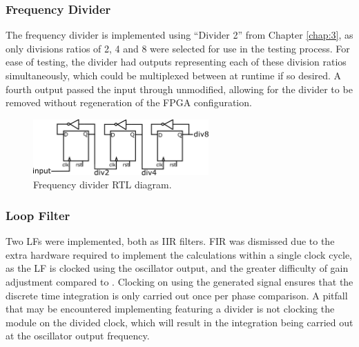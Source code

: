 \subsubsection{Frequency Divider}
The frequency divider is implemented using ``Divider 2'' from Chapter \ref{chap:3}, as only divisions ratios of 2, 4 and 8 were selected for use in the testing process. For ease of testing, the divider had outputs representing each of these division ratios simultaneously, which could be multiplexed between at runtime if so desired. A fourth output passed the input through unmodified, allowing for the divider to be removed without regeneration of the \ac{FPGA} configuration.
\begin{figure}[h]%
    \centering
    \includegraphics[width=0.6\textwidth]{../divider2}
    \caption[Frequency divider \ac{RTL} diagram]{Frequency divider \ac{RTL} diagram.}
    \label{fig:divs_impl}
\end{figure}

\subsubsection{Loop Filter}
Two \aclp{LF} were implemented, both as \ac{IIR} filters. \ac{FIR} was dismissed due to the extra hardware required to implement the calculations within a single clock cycle, as the \ac{LF} is clocked using the oscillator output, and the greater difficulty of gain adjustment compared to . Clocking on using the generated signal ensures that the discrete time integration is only carried out once per phase comparison. A pitfall that may be encountered implementing  featuring a divider is not clocking the module on the divided clock, which will result in the integration being carried out at the oscillator output frequency.

